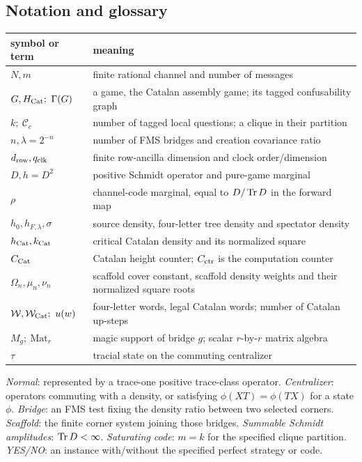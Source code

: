 \subsection*{Notation and glossary}
\begin{center}\small
\begin{tabular}{@{}>{\raggedright\arraybackslash}p{.26\linewidth}>{\raggedright\arraybackslash}p{.67\linewidth}@{}}\toprule
symbol or term&meaning\\\midrule
$N,m$&finite rational channel and number of messages\\
$G,\Gcat;\ \Gamma(G)$&a game, the Catalan assembly game; its tagged confusability graph\\
$k;\ \mathcal C_c$&number of tagged local questions; a clique in their partition\\
$n,\lambda=2^{-n}$&number of FMS bridges and creation covariance ratio\\
$d_{\mathrm{row}},q_{\mathrm{clk}}$&finite row-ancilla dimension and clock order/dimension\\
$D,h=D^2$&positive Schmidt operator and pure-game marginal\\
$\rho$&channel-code marginal, equal to $D/\operatorname{Tr} D$ in the forward map\\
$h_0,h_{F,\lambda},\sigma$&source density, four-letter tree density and spectator density\\
$h_{\mathrm{Cat}},k_{\mathrm{Cat}}$&critical Catalan density and its normalized square\\
$C_{\mathrm{Cat}}$&Catalan height counter; $C_{\rm ctr}$ is the computation counter\\
$\Omega_n,\mu_n,\nu_n$&scaffold cover constant, scaffold density weights and their normalized square roots\\
$\mathcal W,\mathcal W_{\rm Cat};\ u(w)$&four-letter words, legal Catalan words; number of Catalan up-steps\\
$M_g;\ \mathrm{Mat}_r$&magic support of bridge $g$; scalar $r$-by-$r$ matrix algebra\\
$\tau$&tracial state on the commuting centralizer\\\bottomrule
\end{tabular}
\end{center}
\noindent\emph{Normal}: represented by a trace-one positive trace-class operator.
\emph{Centralizer}: operators commuting with a density, or satisfying $\phi(XT)=\phi(TX)$ for a state $\phi$.
\emph{Bridge}: an FMS test fixing the density ratio between two selected corners.
\emph{Scaffold}: the finite corner system joining those bridges.
\emph{Summable Schmidt amplitudes}: $\operatorname{Tr} D<\infty$.
\emph{Saturating code}: $m=k$ for the specified clique partition.
\emph{YES/NO}: an instance with/without the specified perfect strategy or code.
